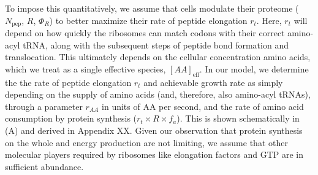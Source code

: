 
To impose this quantitatively, we assume that cells modulate their proteome
($N_\text{pep}$, $R$, $\Phi_R$) to better maximize their rate of peptide
elongation $r_t$.  Here, $r_t$ will depend on how quickly the ribosomes can
match codons with their correct amino-acyl tRNA, along with the subsequent steps
of peptide bond formation and translocation. This ultimately depends on the
cellular concentration amino acids, which we treat as a single effective
species, $[AA]_\text{eff}$. In our model, we determine the the rate of peptide
elongation $r_t$ and achievable growth rate as simply depending on the supply of
amino acids (and, therefore, also amino-acyl tRNAs), through a parameter
$r_{AA}$ in units of AA per second, and the rate of amino acid consumption by
protein synthesis ($r_t \times R \times f_a$). This is shown schematically in
(A) and derived in Appendix XX. Given our observation
that protein synthesis on the whole and energy production are not limiting, we
assume that other molecular players required by ribosomes like elongation
factors and GTP are in sufficient abundance.

%

